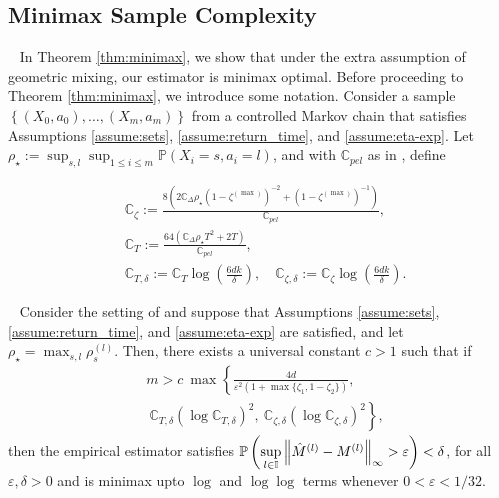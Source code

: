 \documentclass[opre,sglanonrev]{informs4}
\numberwithin{equation}{section}
\newcommand{\pow}[1]{^{(#1)}}
\newcommand{\lp}{\left(}
\newcommand{\rp}{\right)}
\newcommand{\lc}{\left\{}
\newcommand{\rc}{\right\}}
\newcommand{\ldot}{\left.}
\newcommand{\rdot}{\right.}
\newcommand{\History}{\mathcal{H}}
\newcommand{\history}{\hbar}
\newcommand{\Cbb}{\mathbb{C}}
\newcommand{\Ibb}{\mathbb{I}}
\newcommand{\Pbb}{\mathbb{P}}
\newcommand{\Lcal}{\mathcal{L}}
\newcommand{\constant}{\Cbb}
\newcommand{\indexeddata}{\left\{(X_0,a_0),\dots,(X_m,a_m)\right\}}
\newcommand{\prob}{\Pbb}
\newcommand{\eps}{\varepsilon}
\renewcommand{\epsilon}{\eps}
\begin{document}
{{\subsection{Minimax Sample Complexity}~\label{sec:minimax-sc}
In Theorem \ref{thm:minimax}, we show that under the extra assumption of geometric mixing, our estimator is minimax optimal.
Before proceeding to Theorem \ref{thm:minimax}, we introduce some notation. Consider a sample $\indexeddata$ from a controlled Markov chain that satisfies Assumptions \ref{assume:sets}, \ref{assume:return_time}, and \ref{assume:eta-exp}. Let $\rho_\star:=\sup_{s,l} \sup_{1\leq i\leq m} \prob\lp X_i=s,a_i=l\rp$, and with $\constant_{pel}$ as in , define
}
{
\begin{align*}
    &\constant_\zeta := \frac{8\lp2\constant_\Delta\rho_\star \lp1-\zeta\pow\max\rp^{-2}+\lp1-\zeta\pow\max\rp^{-1} \rp}{\constant_{pel}},\\
    &\constant_T := \frac{64\lp \constant_\Delta\rho_\star T^2+2T \rp}{\constant_{pel}},\\
    &\constant_{T,\delta}  :=\constant_T\log\lp\frac{6dk}{\delta}\rp,\quad  \constant_{\zeta,\delta} := \constant_\zeta\log\lp\frac{6dk}{\delta}\rp.
\end{align*}
%
\begin{theorem}~\label{thm:minimax}
Consider the setting of  and suppose that Assumptions \ref{assume:sets}, \ref{assume:return_time}, and  \ref{assume:eta-exp} are satisfied, and let $\rho_\star=\max_{s,l}\rho_s\pow{l}$. Then, there exists a universal constant $c>1$ such that if
\begin{align*}
    & m> c \ \max\lc\frac{4d}{\epsilon^2\lp1+\max\{\zeta_1,1-\zeta_2\}\rp},\rdot\\&\ldot\ldot\ \constant_{T,\delta}\lp\log\constant_{T,\delta}\rp^2,\rdot \ \constant_{\zeta,\delta}\lp\log \constant_{\zeta,\delta}\rp^2%
    \rc,
\end{align*}
then the empirical estimator satisfies
$  \prob\left(\underset{l\in \Ibb}{\sup} \left\|\Hat{M}^{(l)}-M^{(l)}\right\|_{\infty}>\epsilon  \right)< \delta$,
for all $\eps,\delta>0$ and is minimax upto $\log$ and $\log\log$ terms whenever $0<\eps<1/32$. 
\end{theorem}
}}
\end{document}
